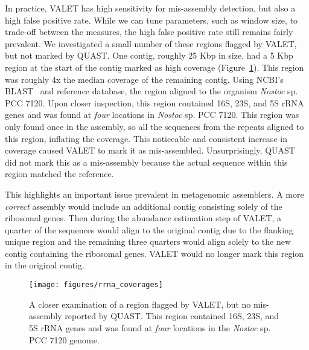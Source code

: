 In practice, VALET has high sensitivity for mis-assembly detection, but also a high false positive rate.
While we can tune parameters, such as window size, to trade-off between the measures, the high false positive rate still remains fairly prevalent.
We investigated a small number of these regions flagged by VALET, but not marked by QUAST.
One contig, roughly 25 Kbp in size, had a 5 Kbp region at the start of the contig marked as high coverage (Figure~\ref{fig:rrna_misassembly}).
This region was roughly 4x the median coverage of the remaining contig.
Using NCBI's BLAST~\cite{blast} and reference database, the region aligned to the organism \emph{Nostoc} sp. PCC 7120.
Upon closer inspection, this region contained 16S, 23S, and 5S rRNA genes and was found at \emph{four} locations in  \emph{Nostoc} sp. PCC 7120.
This region was only found once in the assembly, so all the sequences from the repeats aligned to this region, inflating the coverage.
This noticeable and consistent increase in coverage caused VALET to mark it as mis-assembled.
Unsurprisingly, QUAST did not mark this as a mis-assembly because the actual sequence within this region matched the reference.

This highlights an important issue prevalent in metagenomic assemblers.
A more \emph{correct} assembly would include an additional contig consisting solely of the ribosomal genes.
Then during the abundance estimation step of VALET, a quarter of the sequences would align to the original contig due to the flanking unique region and the remaining three quarters would align solely to the new contig containing the ribosomal genes.
VALET would no longer mark this region in the original contig.

\begin{figure}[tb!]
\begin{center}
\texttt{[image: figures/rrna\_coverages]}
\end{center}
\renewcommand{\baselinestretch}{1}
\small\normalsize
\begin{quote}
\caption[Ribosomal genes found in region marked by VALET]{A closer examination of a region flagged by VALET, but no mis-assembly reported by QUAST. This region contained 16S, 23S, and 5S rRNA genes and was found at \emph{four} locations in the \emph{Nostoc} sp. PCC 7120 genome.}
\label{fig:rrna_misassembly}
\end{quote}
\end{figure}
\renewcommand{\baselinestretch}{2}
\small\normalsize

